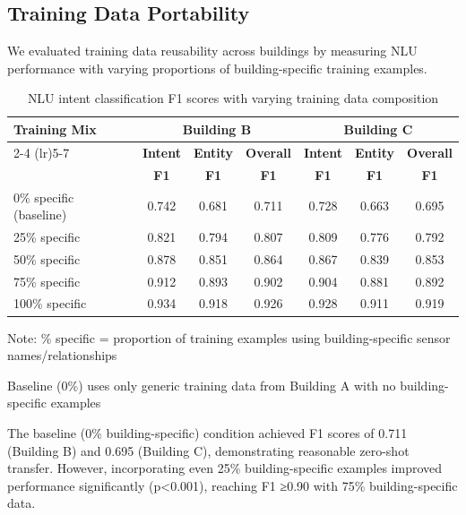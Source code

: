 \documentclass[acmlarge]{acmart}
\begin{document}
\subsection{Training Data Portability}

We evaluated training data reusability across buildings by measuring NLU performance with varying proportions of building-specific training examples.

\begin{table}[h]
\centering
\begin{threeparttable}
\caption{NLU intent classification F1 scores with varying training data composition}
\label{tab:training-portability}
\scriptsize
\begin{tabular}{@{}lcccccc@{}}
\toprule
\multirow{2}{*}{\textbf{Training Mix}} & \multicolumn{3}{c}{\textbf{Building B}} & \multicolumn{3}{c}{\textbf{Building C}} \\
\cmidrule(lr){2-4} \cmidrule(lr){5-7}
 & \textbf{Intent} & \textbf{Entity} & \textbf{Overall} & \textbf{Intent} & \textbf{Entity} & \textbf{Overall} \\
 & \textbf{F1} & \textbf{F1} & \textbf{F1} & \textbf{F1} & \textbf{F1} & \textbf{F1} \\
\midrule
0\% specific (baseline) & 0.742 & 0.681 & 0.711 & 0.728 & 0.663 & 0.695 \\
25\% specific & 0.821 & 0.794 & 0.807 & 0.809 & 0.776 & 0.792 \\
50\% specific & 0.878 & 0.851 & 0.864 & 0.867 & 0.839 & 0.853 \\
75\% specific & 0.912 & 0.893 & 0.902 & 0.904 & 0.881 & 0.892 \\
100\% specific & 0.934 & 0.918 & 0.926 & 0.928 & 0.911 & 0.919 \\
\bottomrule
\end{tabular}
\begin{tablenotes}
\small
\item Note: \% specific = proportion of training examples using building-specific sensor names/relationships
\item Baseline (0\%) uses only generic training data from Building A with no building-specific examples
\end{tablenotes}
\end{threeparttable}
\end{table}

The baseline (0\% building-specific) condition achieved F1 scores of 0.711 (Building B) and 0.695 (Building C), demonstrating reasonable zero-shot transfer. However, incorporating even 25\% building-specific examples improved performance significantly (p<0.001), reaching F1 ≥0.90 with 75\% building-specific data.
\end{document}
